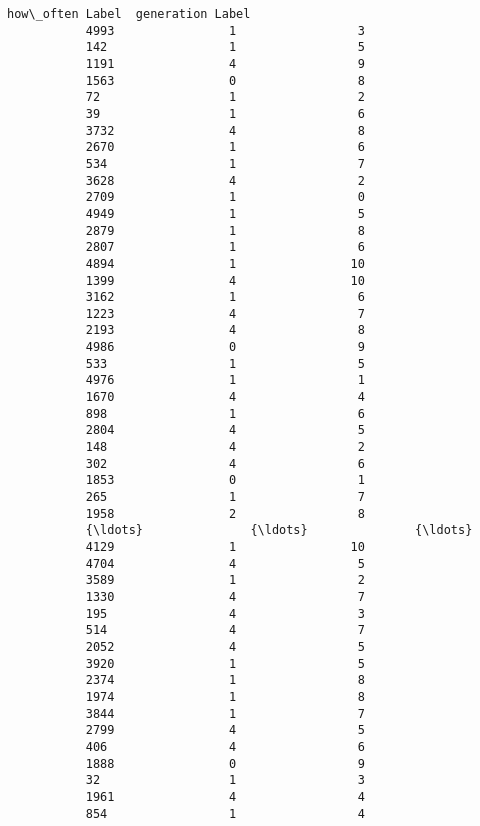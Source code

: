 \documentclass[11pt]{article}
\begin{document}
\begin{Verbatim}[commandchars=\\\{\}]
                 how\_often Label  generation Label  
           4993                1                 3  
           142                 1                 5  
           1191                4                 9  
           1563                0                 8  
           72                  1                 2  
           39                  1                 6  
           3732                4                 8  
           2670                1                 6  
           534                 1                 7  
           3628                4                 2  
           2709                1                 0  
           4949                1                 5  
           2879                1                 8  
           2807                1                 6  
           4894                1                10  
           1399                4                10  
           3162                1                 6  
           1223                4                 7  
           2193                4                 8  
           4986                0                 9  
           533                 1                 5  
           4976                1                 1  
           1670                4                 4  
           898                 1                 6  
           2804                4                 5  
           148                 4                 2  
           302                 4                 6  
           1853                0                 1  
           265                 1                 7  
           1958                2                 8  
           {\ldots}               {\ldots}               {\ldots}  
           4129                1                10  
           4704                4                 5  
           3589                1                 2  
           1330                4                 7  
           195                 4                 3  
           514                 4                 7  
           2052                4                 5  
           3920                1                 5  
           2374                1                 8  
           1974                1                 8  
           3844                1                 7  
           2799                4                 5  
           406                 4                 6  
           1888                0                 9  
           32                  1                 3  
           1961                4                 4  
           854                 1                 4  

\end{Verbatim}
\end{document}
